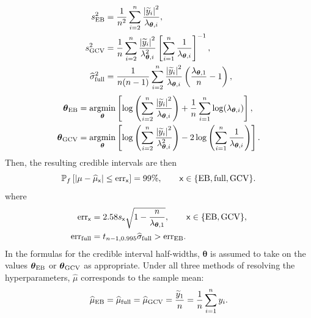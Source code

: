 \documentclass[graybox,footinfo]{svmult}
\newcommand{\bm}[1]{\boldsymbol{#1}}
\newcommand{\vtheta}{{\bm{\theta}}}
\newcommand{\hmu}{\widehat{\mu}}
\newcommand{\hsigma}{\widehat{\sigma}}
\newcommand{\MLE}{\textup{EB}}
\newcommand{\full}{\textup{full}}
\newcommand{\GCV}{\textup{GCV}}
\newcommand{\err}{\textup{err}}
\def\abs#1{\ensuremath{\left \lvert #1 \right \rvert}}
\providecommand{\argmin}{\operatorname*{argmin}}
\begin{document}
	\begin{subequations}
		\begin{align}
		\nonumber
		s^2_\MLE 
		& =
		\frac{1}{n^2} 
		\sum_{i=2}^n \frac{\abs{\widetilde{y}_i}^2}{\lambda_{\vtheta,i}},  \\
		\nonumber 
		s^2_{\textup{GCV}} & =  \frac 1{n} \sum_{i=2}^n \frac{\abs{\widetilde{y}_i}^2}{\lambda_{\vtheta,i}^2}  \left [ \sum_{i=1}^n \frac{1}{\lambda_{\vtheta,i}} \right]^{-1}, \\
		\nonumber
		\widehat{\sigma}^2_{\textup{full}} &= \frac{1}{n(n-1)} \sum_{i=2}^n \frac{\abs{\widetilde{y}_i}^2}{\lambda_{\vtheta,i}}  \left(\frac{\lambda_{\vtheta,1}}{n}  - 1  \right), 
		\end{align}
	\end{subequations}
	\begin{subequations}
		\label{eqn:fastTheta}
		\begin{align}
		\label{eqn:fastThetaMLE}
		\vtheta_\MLE
		&= 
		\argmin_{\vtheta}
		\left[
		\log\left(
		\sum_{i=2}^n \frac{\abs{\widetilde{y}_i}^2}{\lambda_{\vtheta,i}}
		\right) 
		+ \frac{1}{n}\sum_{i=1}^n \log(\lambda_{\vtheta,i})
		\right],\\
		\label{eqn:fastThetaGCV} 
		\vtheta_{\GCV} 
		&= \argmin_\vtheta \left[ \log \left ( \sum_{i=2}^n \frac{\abs{\widetilde{y}_i}^2}{\lambda_{\vtheta,i}^2} 
		\right)  
		-2\log\left( \sum_{i=1}^n \frac{1}{\lambda_{\vtheta,i}} \right)
		\right].
		\end{align}
	\end{subequations}
Then, the resulting credible intervals are then
	\begin{equation}
	\label{eqn_prob_CI}
	\mathbb{P}_f \left[
	|\mu-\hmu_{\mathsf{x}}| \leq \err_{\mathsf{x}} \right]  = 99\%, \qquad \mathsf{x} \in \{\MLE, \full, \GCV\}.
	\end{equation}
where 
\begin{subequations}
	\label{errSimple}
	\begin{align}
		\label{eqn:err_MLEGCV}
		\err_{\mathsf{x}} & = 2.58 s_{\mathsf{x}} \sqrt{1 - \frac{n}{\lambda_{\vtheta,1}} }, \qquad \mathsf{x} \in \{\MLE, \GCV\},  \\ 
		\err_{\textup{full}} 
		& = t_{n-1,0.995} \hsigma_{\textup{full}} > \err_\MLE. \label{FJH:eq:errFull}
	\end{align}
\end{subequations}
In the formulas for the credible interval half-widths, $\vtheta$ is assumed to take on the values $\vtheta_{\MLE}$ or $\vtheta_{\GCV}$ as appropriate.  Under all three methods of resolving the hyperparameters, $\hmu$ corresponds to the sample mean:
	\begin{equation}
	\label{muhatGCV-FB-MLE-Simple}
	\hmu_\MLE  = \hmu_{\full} = \hmu_{\GCV} =
	\frac{\widetilde{y}_1}{n} = \frac 1n \sum_{i=1}^n y_i.
	\end{equation}
\end{document}
